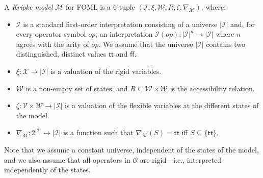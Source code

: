 \documentclass{easychair}
\newcommand{\fun}{\rightarrow}
\newcommand{\true}{\textsf{tt}}
\newcommand{\false}{\textsf{ff}}
\newcommand{\modal}{\nabla}
\newcommand{\II}{\mathcal{I}}
\newcommand{\MM}{\mathcal{M}}
\newcommand{\OO}{\mathcal{O}}
\newcommand{\VV}{\mathcal{V}}
\newcommand{\WW}{\mathcal{W}}
\newcommand{\XX}{\mathcal{X}}
\newcommand{\edmargin}[2]{\marginpar{\raggedright\footnotesize\color{red}#1: #2}}
\newcommand{\edmargin}[2]{}
\def\llmargin{\edmargin{LL}}
\def\smmargin{\edmargin{SM}}
\begin{document}
A \emph{Kripke model} $\MM$ for FOML
is a 6-tuple $(\II, \xi, \WW, R, \zeta, \modal_{\MM})$,
where:
\begin{itemize}
\item $\II$ is a standard first-order interpretation consisting of a universe
  $|\II|$ and, for every operator symbol $op$, an interpretation
%
  \(
    \II(op): |\II|^n \rightarrow |\II|
  \)
%
  where $n$ agrees with the arity of $op$. We assume that the universe $|\II|$
  contains two distinguished, distinct values $\true$ and $\false$.
\item $\xi: \XX \rightarrow |\II|$ is a valuation of the rigid variables.
\item $\WW$ is a non-empty set of states, and
  $R \subseteq \WW \times \WW$ is the accessibility relation.
\item $\zeta: \VV \times \WW \rightarrow |\II|$ is a valuation of the flexible
  variables at the different states of the model.
\item $\modal_{\MM}: 2^{|\II|} \fun |\II|$ is a function such that
  $\modal_{\MM}(S) = \true$ iff $S \subseteq \{\true\}$.
\end{itemize}
%
Note that we assume a constant universe, independent of the states of
the model, and we also assume that all operators
in $\OO$
are rigid---i.e., interpreted independently of
the states.
\end{document}
